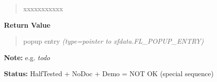\begin{boxedminipage}{\funcwidth}
\begin{quote}
\begin{Ventry}{xxxxxxxxxxx}
        \end{Ventry}

      \end{quote}

      \textbf{Return Value}
    \vspace{-1ex}

      \begin{quote}

popup entry
      {\it (type=pointer to xfdata.FL\_POPUP\_ENTRY)}

      \end{quote}

\textbf{Note:} 
e.g. \emph{todo}


\textbf{Status:} 
HalfTested + NoDoc + Demo = NOT OK (special sequence)


    \end{boxedminipage}

    \label{xformslib:flselect:fl_replace_select_item}

    \vspace{0.5ex}

